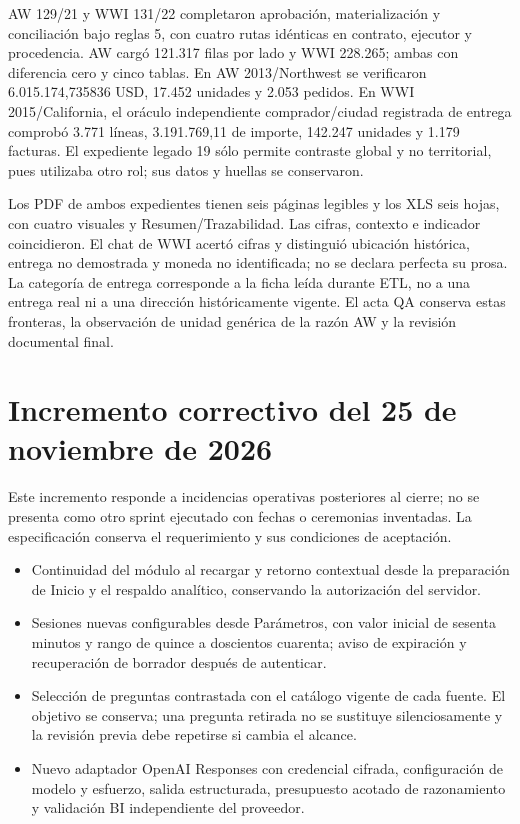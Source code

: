 \documentclass[11pt,letterpaper]{article}
\begin{document}
AW 129/21 y WWI 131/22 completaron aprobación, materialización y conciliación bajo
reglas 5, con cuatro rutas idénticas en contrato, ejecutor y procedencia. AW cargó
121.317 filas por lado y WWI 228.265; ambas con diferencia cero y cinco tablas.
En AW 2013/Northwest se verificaron 6.015.174,735836 USD, 17.452 unidades y 2.053
pedidos. En WWI 2015/California, el oráculo independiente comprador/ciudad registrada
de entrega comprobó 3.771 líneas, 3.191.769,11 de importe, 142.247 unidades y 1.179
facturas. El expediente legado 19 sólo permite contraste global y no territorial,
pues utilizaba otro rol; sus datos y huellas se conservaron.

Los PDF de ambos expedientes tienen seis páginas legibles y los XLS seis hojas,
con cuatro visuales y Resumen/Trazabilidad. Las cifras, contexto e indicador
coincidieron. El chat de WWI acertó cifras y distinguió ubicación histórica,
entrega no demostrada y moneda no identificada; no se declara perfecta su prosa.
La categoría de entrega corresponde a la ficha leída durante ETL, no a una entrega
real ni a una dirección históricamente vigente. El acta QA conserva estas fronteras,
la observación de unidad genérica de la razón AW y la revisión documental final.


\section{Incremento correctivo del 25 de noviembre de 2026}

Este incremento responde a incidencias operativas posteriores al cierre; no se
presenta como otro sprint ejecutado con fechas o ceremonias inventadas. La
especificación 
conserva el requerimiento y sus condiciones de aceptación.

\begin{itemize}
\item Continuidad del módulo al recargar y retorno contextual desde la preparación
de Inicio y el respaldo analítico, conservando la autorización del servidor.
\item Sesiones nuevas configurables desde Parámetros, con valor inicial de sesenta
minutos y rango de quince a doscientos cuarenta; aviso de expiración y recuperación
de borrador después de autenticar.
\item Selección de preguntas contrastada con el catálogo vigente de cada fuente.
El objetivo se conserva; una pregunta retirada no se sustituye silenciosamente y
la revisión previa debe repetirse si cambia el alcance.
\item Nuevo adaptador OpenAI Responses con credencial cifrada, configuración de
modelo y esfuerzo, salida estructurada, presupuesto acotado de razonamiento y
validación BI independiente del proveedor.
\end{itemize}
\end{document}
